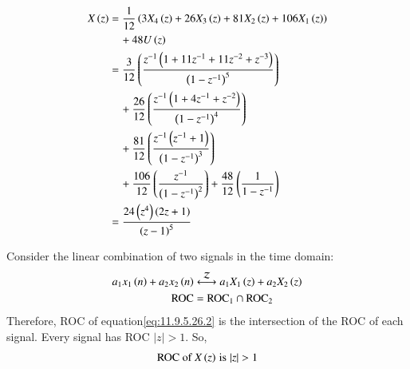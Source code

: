 \documentclass[journal,12pt,twocolumn]{IEEEtran}
\theoremstyle{remark}
\begin{document}
\begin{enumerate}[label=\arabic*.]
\begin{align}
\end{align}
\begin{align}
X\left(z\right) &= \frac{1}{12}\left(3X_4\left(z\right) + 26X_3\left(z\right) + 81X_2\left(z\right) + 106X_1\left(z\right)\right) \label{eq:11.9.5.26.2} \notag \\
&\quad + 48U \left(z\right) \\
&= \frac{3}{12}\left(\frac{z^{-1}\left(1+11z^{-1}+11z^{-2}+z^{-3}\right)}{\left(1-z^{-1}\right)^5}\right) \notag \\
&\quad + \frac{26}{12}\left(\frac{z^{-1}\left(1+4z^{-1}+z^{-2}\right)}{\left(1-z^{-1}\right)^4}\right) \\
&\quad + \frac{81}{12}\left(\frac{z^{-1}\left(z^{-1}+1\right)}{\left(1-z^{-1}\right)^3}\right) \notag \\
&\quad + \frac{106}{12}\left(\frac{z^{-1}}{\left(1-z^{-1}\right)^2}\right) + \frac{48}{12}\left(\frac{1}{1 - z^{-1}} \right) \notag \\
&= \frac{24 \left(z^4\right) \left(2z+1\right)}{\left(z-1\right)^5}
\end{align}


Consider the linear combination of two signals in the time domain:
\begin{align}
    a_1 x_1\left(n\right) + a_2 x_2\left(n\right) &\stackrel{\mathcal{Z}}{\longleftrightarrow} a_1 X_1\left(z\right) + a_2 X_2\left(z\right) \label{eq:combined_signal}\\
    \text{ROC} &= \text{ROC}_1 \cap \text{ROC}_2 \label{eq:roc_intersection}
\end{align}
Therefore, ROC of equation\eqref{eq:11.9.5.26.2} is the intersection of the ROC of each signal. Every signal has ROC $|z|>1$. So,
\begin{align}
    \text{ROC of $X\brak{z}$} \text{\hspace{3pt}is\hspace{3pt}} |z|>1
\end{align}


\end{enumerate}
\end{document}
